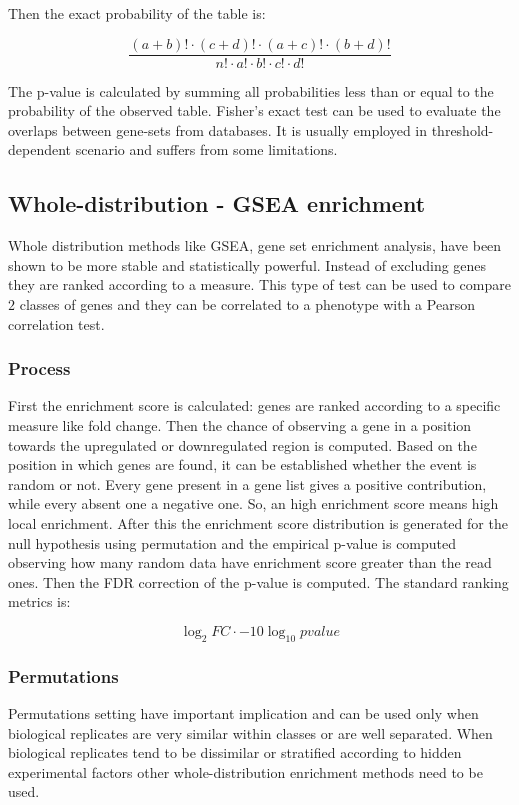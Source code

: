 		Then the exact probability of the table is:

		$$\frac{(a+b)!\cdot(c+d)!\cdot(a+c)!\cdot(b+d)!}{n!\cdot a!\cdot b!\cdot c!\cdot d!}$$

		The p-value is calculated by summing all probabilities less than or equal to the probability of the observed table.
		Fisher's exact test can be used to evaluate the overlaps between gene-sets from databases.
		It is usually employed in threshold-dependent scenario and suffers from some limitations.

	\subsection{Whole-distribution - GSEA enrichment}
	Whole distribution methods like GSEA, gene set enrichment analysis, have been shown to be more stable and statistically powerful.
	Instead of excluding genes they are ranked according to a measure.
	This type of test can be used to compare $2$ classes of genes and they can be correlated to a phenotype with a Pearson correlation test.

		\subsubsection{Process}
		First the enrichment score is calculated: genes are ranked according to a specific measure like fold change.
		Then the chance of observing a gene in a position towards the upregulated or downregulated region is computed.
		Based on the position in which genes are found, it can be established whether the event is random or not.
		Every gene present in a gene list gives a positive contribution, while every absent one a negative one.
		So, an high enrichment score means high local enrichment.
		After this the enrichment score distribution is generated for the null hypothesis using permutation and the empirical p-value is computed observing how many random data have enrichment score greater than the read ones.
		Then the FDR correction of the p-value is computed.
		The standard ranking metrics is:

		$$\log_2 FC\cdot -10\log_{10} pvalue$$

		\subsubsection{Permutations}
		Permutations setting have important implication and can be used only when biological replicates are very similar within classes or are well separated.
		When biological replicates tend to be dissimilar or stratified according to hidden experimental factors other whole-distribution enrichment methods need to be used.

